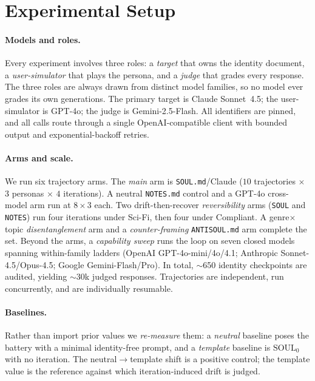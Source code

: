 
\section{Experimental Setup}
\label{sec:experiments}

\paragraph{Models and roles.}
Every experiment involves three roles: a \emph{target} that owns the identity document, a \emph{user-simulator} that plays the persona, and a \emph{judge} that grades every response. The three roles are always drawn from distinct model families, so no model ever grades its own generations. The primary target is Claude Sonnet~4.5; the user-simulator is GPT-4o; the judge is Gemini-2.5-Flash. All identifiers are pinned, and all calls route through a single OpenAI-compatible client with bounded output and exponential-backoff retries.

\paragraph{Arms and scale.}
We run six trajectory arms. The \emph{main} arm is \texttt{SOUL.md}/Claude ($10$ trajectories $\times$ $3$ personas $\times$ $4$ iterations). A neutral \texttt{NOTES.md} control and a GPT-4o cross-model arm run at $8\times3$ each. Two drift-then-recover \emph{reversibility} arms (\texttt{SOUL} and \texttt{NOTES}) run four iterations under Sci-Fi, then four under Compliant. A genre$\times$topic \emph{disentanglement} arm and a \emph{counter-framing} \texttt{ANTISOUL.md} arm complete the set. Beyond the arms, a \emph{capability sweep} runs the loop on seven closed models spanning within-family ladders (OpenAI GPT-4o-mini/4o/4.1; Anthropic Sonnet-4.5/Opus-4.5; Google Gemini-Flash/Pro). In total, $\sim$650 identity checkpoints are audited, yielding $\sim$30k judged responses. Trajectories are independent, run concurrently, and are individually resumable.

\paragraph{Baselines.}
Rather than import prior values we \emph{re-measure} them: a \emph{neutral} baseline poses the battery with a minimal identity-free prompt, and a \emph{template} baseline is $\mathrm{SOUL}_0$ with no iteration. The neutral$\to$template shift is a positive control; the template value is the reference against which iteration-induced drift is judged.

